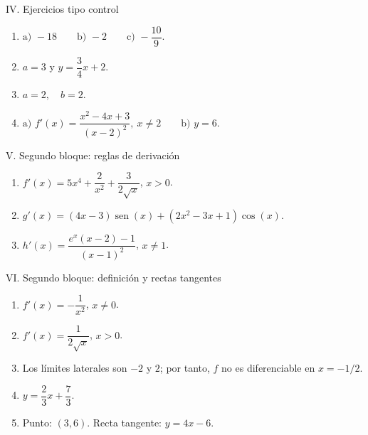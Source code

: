 \documentclass[letterpaper,12pt]{article}
\newcommand{\sen}{\operatorname{sen}}
\begin{document}
\begin{respuestasbox}{IV. Ejercicios tipo control}
\begin{enumerate}[label=\color{azulFuerte}\textbf{\arabic*.},leftmargin=*,start=17,itemsep=0.9em]
    \item \(\boxed{\text{a) }-18\qquad \text{b) }-2\qquad \text{c) }-\dfrac{10}{9}}\).
    \item \(\boxed{a=3}\) y \(\boxed{y=\dfrac34x+2}\).
    \item \(\boxed{a=2,\quad b=2}\).
    \item \(\boxed{\text{a) }f'(x)=\dfrac{x^2-4x+3}{(x-2)^2},\ x\neq2\qquad \text{b) }y=6}\).
\end{enumerate}
\end{respuestasbox}

\begin{respuestasbox}{V. Segundo bloque: reglas de derivación}
\begin{enumerate}[label=\color{azulFuerte}\textbf{\arabic*.},leftmargin=*,start=21,itemsep=0.8em]
    \item \(\boxed{f'(x)=5x^4+\dfrac{2}{x^2}+\dfrac{3}{2\sqrt{x}}}\), \(x>0\).
    \item \(\boxed{g'(x)=(4x-3)\sen(x)+(2x^2-3x+1)\cos(x)}\).
    \item \(\boxed{h'(x)=\dfrac{e^x(x-2)-1}{(x-1)^2}}\), \(x\neq1\).
\end{enumerate}
\end{respuestasbox}

\begin{respuestasbox}{VI. Segundo bloque: definición y rectas tangentes}
\begin{enumerate}[label=\color{azulFuerte}\textbf{\arabic*.},leftmargin=*,start=24,itemsep=0.8em]
    \item \(\boxed{f'(x)=-\dfrac{1}{x^2}}\), \(x\neq0\).
    \item \(\boxed{f'(x)=\dfrac{1}{2\sqrt{x}}}\), \(x>0\).
    \item Los límites laterales son \(\boxed{-2}\) y \(\boxed{2}\); por tanto, \(f\) no es diferenciable en \(x=-1/2\).
    \item \(\boxed{y=\dfrac23x+\dfrac73}\).
    \item Punto: \(\boxed{(3,6)}\). Recta tangente: \(\boxed{y=4x-6}\).
\end{enumerate}
\end{respuestasbox}
\end{document}

